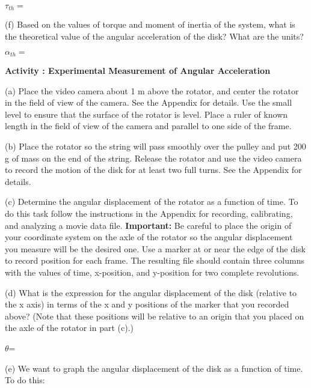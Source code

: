 \( \tau _{th}= \)
\vspace{5mm}

(f) Based on the values of torque and moment of inertia of the system, what
is the theoretical value of the angular acceleration of the disk? What are the
units? 
\vspace{5mm}

\( \alpha _{th}= \)
\vspace{5mm}

\textbf{Activity  : Experimental Measurement of Angular Acceleration} 

(a) Place the video camera about 1 m above the rotator, and center the rotator in the field of view of the camera.  See
the Appendix for details.
Use the small level to ensure that the surface of the rotator is level. Place a ruler of 
known length in the field of view of the camera and parallel to one side of the frame.

(b) Place the rotator so the string will pass smoothly over the pulley and put
200 g of mass on the end of the string. Release the rotator and use the
video camera to record the motion of the disk for at least two full turns. See
the Appendix for details.

(c) Determine the angular displacement of the rotator as a function of time. 
To do this task follow the instructions in the Appendix for recording, calibrating, and analyzing a movie data file. 
\textbf{Important:} Be careful to place the origin of your coordinate system on the axle of the
rotator so the angular displacement you measure will be the desired one. 
Use a marker at or near the edge of the disk to record position for each frame. 
The resulting file should contain three columns with the values of time, x-position, and y-position for two complete revolutions.

(d) What is the expression for the angular displacement of the disk (relative to the x axis) 
in terms of the x and y positions of the marker that you recorded above? (Note that these 
positions will be relative to an origin that you placed on the axle of the rotator in part (c).)
\vspace{5mm}

\( \theta  \)= 
\vspace{5mm}

(e) We want to graph the angular displacement of the disk as a function of time.
To do this:

